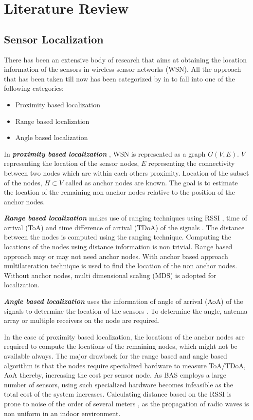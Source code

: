 \chapter{Literature Review}
\label{chp:litReview}
\section{Sensor Localization}
There has been an extensive body of research that aims at obtaining the location information of the sensors in wireless sensor networks (WSN). All the approach that has been taken till now has been categorized by \citeauthor{wang2010survey} in \cite{wang2010survey} to fall into one of the following categories:
\begin{itemize}
\item Proximity based localization
\item Range based localization
\item Angle based localization
\end{itemize}

In \textbf{\textit{proximity based localization}} \cite{bulusu2000gps,4317866,shang2003localization}, WSN is represented as a graph $G(V,E)$. $V$ representing the location of the sensor nodes, $E$ representing the connectivity between two nodes which are within each others proximity. Location of the  subset of the nodes, $H \subset V$ called as anchor nodes are known. The goal is to estimate the location of the remaining non anchor nodes relative to the position of the anchor nodes. 

\textbf{\textit{Range based localization}} makes use of  ranging techniques using RSSI \cite{mao2007path}, time of arrival (ToA) \cite{moses2003self} and time difference of arrival (TDoA) of the signals \cite{4058681}. The distance between the nodes is computed using the ranging technique. Computing the locations of the nodes using distance information is non trivial. Range based approach may or may not need anchor nodes. With anchor based approach multilateration technique is used to find the location of the non anchor nodes. Without anchor nodes, multi dimensional scaling (MDS) is adopted for localization. 

\textbf{\textit{Angle based  localization}} uses the information of angle of arrival (AoA) of the signals to determine the location of the sensors \cite{nasipuri2002directionality,rong2006angle}. To determine the angle, antenna array or multiple receivers on the node are required.

In the case of proximity based localization, the locations of the anchor nodes are required to compute the locations of the remaining nodes, which might not be available always. The major drawback for the range based and angle based algorithm is that the nodes require specialized hardware to measure ToA/TDoA, AoA \cite{4317866} thereby, increasing the cost per sensor node. As BAS employs a large number of sensors, using such specialized hardware becomes infeasible as the total cost of the system increases. Calculating distance based on the RSSI is prone to noise of the order of several meters \cite{bachrach2005localization}, as the propagation of radio waves is non uniform in an indoor environment.


